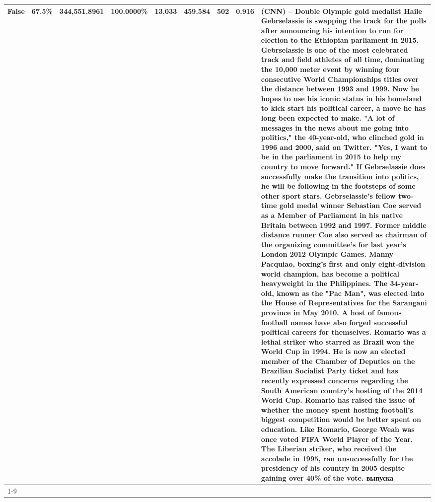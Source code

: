 \begin{table}[H]
{\begin{tabular}{lllrlllll}
False & 67.5\% & 344,551.8961 & \bfseries \color{red} 100.0000\% & \bfseries \color{red} 13.033 & 459.584 & 502 & 0.916 & (CNN) -- Double Olympic gold medalist Haile Gebrselassie is swapping the track for the polls after announcing his intention to run for election to the Ethiopian parliament in 2015. Gebrselassie is one of the most celebrated track and field athletes of all time, dominating the 10,000 meter event by winning four consecutive World Championships titles over the distance between 1993 and 1999. Now he hopes to use his iconic status in his homeland to kick start his political career, a move he has long been expected to make. "A lot of messages in the news about me going into politics," the 40-year-old, who clinched gold in 1996 and 2000, said on Twitter. "Yes, I want to be in the parliament in 2015 to help my country to move forward." If Gebrselassie does successfully make the transition into politics, he will be following in the footsteps of some other sport stars. Gebrselassie's fellow two-time gold medal winner Sebastian Coe served as a Member of Parliament in his native Britain between 1992 and 1997. Former middle distance runner Coe also served as chairman of the organizing committee's for last year's London 2012 Olympic Games. Manny Pacquiao, boxing's first and only eight-division world champion, has become a political heavyweight in the Philippines. The 34-year-old, known as the "Pac Man", was elected into the House of Representatives for the Sarangani province in May 2010. A host of famous football names have also forged successful political careers for themselves. Romario was a lethal striker who starred as Brazil won the World Cup in 1994. He is now an elected member of the Chamber of Deputies on the Brazilian Socialist Party ticket and has recently expressed concerns regarding the South American country's hosting of the 2014 World Cup. Romario has raised the issue of whether the money spent hosting football's biggest competition would be better spent on education. Like Romario, George Weah was once voted FIFA World Player of the Year. The Liberian striker, who received the accolade in 1995, ran unsuccessfully for the presidency of his country in 2005 despite gaining over 40\% of the vote. выпуска \\
\cline{1-9}

\end{tabular}}
\end{table}
